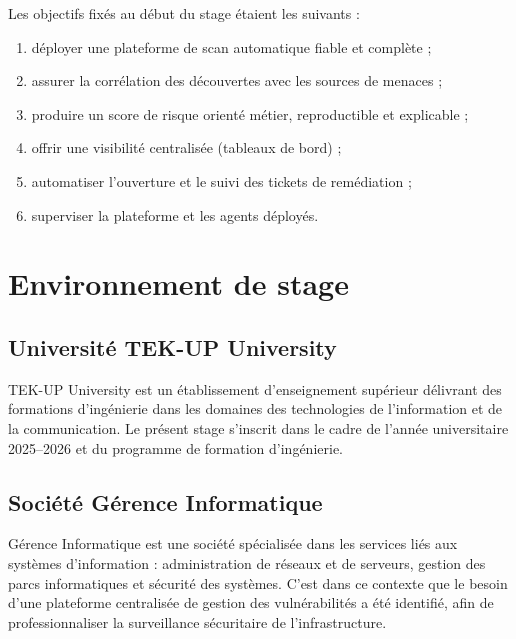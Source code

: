 Les objectifs fix\'es au d\'ebut du stage \'etaient les suivants :

\begin{enumerate}[leftmargin=1.6em]
  \item d\'eployer une plateforme de scan automatique fiable et compl\`ete ;
  \item assurer la corr\'elation des d\'ecouvertes avec les sources de
        menaces ;
  \item produire un score de risque orient\'e m\'etier, reproductible et
        explicable ;
  \item offrir une visibilit\'e centralis\'ee (tableaux de bord) ;
  \item automatiser l'ouverture et le suivi des tickets de rem\'ediation ;
  \item superviser la plateforme et les agents d\'eploy\'es.
\end{enumerate}

\section{Environnement de stage}

\subsection{Universit\'e TEK-UP University}

TEK-UP University est un \'etablissement d'enseignement sup\'erieur
d\'elivrant des formations d'ing\'enierie dans les domaines des technologies
de l'information et de la communication. Le pr\'esent stage s'inscrit dans le
cadre de l'ann\'ee universitaire 2025--2026 et du programme de formation
d'ing\'enierie.

\subsection{Soci\'et\'e G\'erence Informatique}

G\'erence Informatique est une soci\'et\'e sp\'ecialis\'ee dans les services
li\'es aux syst\`emes d'information : administration de r\'eseaux et de
serveurs, gestion des parcs informatiques et s\'ecurit\'e des syst\`emes.
C'est dans ce contexte que le besoin d'une plateforme centralis\'ee de gestion
des vuln\'erabilit\'es a \'et\'e identifi\'e, afin de professionnaliser la
surveillance s\'ecuritaire de l'infrastructure.

